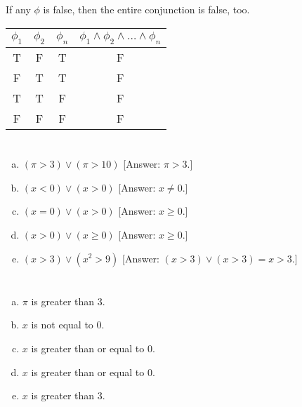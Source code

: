 \documentclass{article}
\begin{document}
\section{}

If any $\phi$ is false, then the entire conjunction is false, too.

\begin{tabular}{ | c | c | c | c | }
  \hline
  $\phi_1$ & $\phi_2$ & $\phi_n$ & $\phi_1 \wedge \phi_2 \wedge \dots \wedge \phi_n$ \\
  \hline
  T & F & T & F \\
  F & T & T & F \\
  T & T & F & F \\
  F & F & F & F \\
  \hline
\end{tabular}

\section{}

\begin{enumerate}[(a)]
\item $(\pi > 3) \vee (\pi > 10)$ [Answer: $\pi > 3$.]
\item $(x < 0) \vee (x > 0)$ [Answer: $x \neq 0$.]
\item $(x = 0) \vee (x > 0)$ [Answer: $x \geq 0$.]
\item $(x > 0) \vee (x \geq 0)$ [Answer: $x \geq 0$.]
\item $(x > 3) \vee (x^2 > 9)$ [Answer: $(x > 3) \vee (x > 3) = x > 3$.]
\end{enumerate}

\section{}

\begin{enumerate}[(a)]
\item $\pi$ is greater than 3.
\item $x$ is not equal to 0.
\item $x$ is greater than or equal to 0.
\item $x$ is greater than or equal to 0.
\item $x$ is greater than 3.
\end{enumerate}

\section{}
\end{document}
